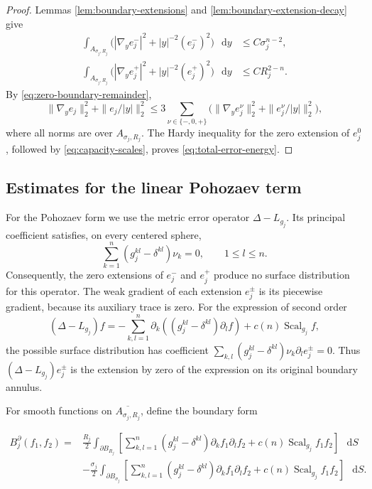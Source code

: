 \documentclass[11pt]{article}
\numberwithin{equation}{section}
\theoremstyle{remark}
\newcommand{\dd}{\mathop{}\!\mathrm{d}}
\begin{document}
\begin{proof}
Lemmas  \ref{lem:boundary-extensions} and
\ref{lem:boundary-extension-decay} give
\[
 \begin{aligned}
 \int_{A_{\sigma_j,R_j}}\bigl(|\nabla_ye_j^-|^2+|y|^{-2}(e_j^-)^2\bigr)\,\dd y
 &\le C\sigma_j^{n-2},\\
 \int_{A_{\sigma_j,R_j}}\bigl(|\nabla_ye_j^+|^2+|y|^{-2}(e_j^+)^2\bigr)\,\dd y
 &\le CR_j^{2-n}.
 \end{aligned}
\]
By \eqref{eq:zero-boundary-remainder},
\[
 \|\nabla_ye_j\|_2^2+\|e_j/|y|\|_2^2
 \le3\sum_{\nu\in\{-,0,+\}}
 \bigl(\|\nabla_ye_j^\nu\|_2^2+\|e_j^\nu/|y|\|_2^2\bigr),
\]
where all norms are over \(A_{\sigma_j,R_j}\). The Hardy inequality
for the zero extension of \(e_j^0\), followed by
\eqref{eq:capacity-scales}, proves \eqref{eq:total-error-energy}.
\end{proof}

\subsection{Estimates for the linear Pohozaev term}

For the Pohozaev form we use the metric error operator
\(\Delta-L_{g_j}\). Its principal coefficient satisfies, on every
centered sphere,
\begin{equation}\label{eq:metric-error-radial-conormal}
 \sum_{k=1}^n(g_j^{kl}-\delta^{kl})\nu_k=0,
 \qquad 1\le l\le n.
\end{equation}
Consequently, the zero extensions of \(e_j^-\) and \(e_j^+\) produce no
surface distribution for this operator.
The weak gradient of each extension \(e_j^\pm\) is its piecewise gradient,
because its auxiliary trace is zero. For the expression of second order
\[
 (\Delta-L_{g_j})f
 =-\sum_{k,l=1}^n\partial_k
 ((g_j^{kl}-\delta^{kl})\partial_lf)+c(n)\operatorname{Scal}_{g_j}f,
\]
the possible surface distribution has coefficient
\(\sum_{k,l}(g_j^{kl}-\delta^{kl})\nu_k\partial_le_j^\pm=0\).
Thus \((\Delta-L_{g_j})e_j^\pm\) is the extension by zero of the
expression on its original boundary annulus.

For smooth functions on \(\overline{A_{\sigma_j,R_j}}\), define the boundary form
 
\begin{equation}\label{eq:dilation-boundary-form}
 \begin{aligned}
  B_j^\partial(f_1,f_2)
 ={}&\frac{R_j}{2}\int_{\partial B_{R_j}}
 \left[
 \sum_{k,l=1}^n(g_j^{kl}-\delta^{kl})\partial_kf_1\partial_lf_2
 +c(n)\operatorname{Scal}_{g_j}f_1f_2\right]\,\dd S\\
 &-\frac{\sigma_j}{2}\int_{\partial B_{\sigma_j}}
 \left[
 \sum_{k,l=1}^n(g_j^{kl}-\delta^{kl})\partial_kf_1\partial_lf_2
 +c(n)\operatorname{Scal}_{g_j}f_1f_2\right]\,\dd S.
 \end{aligned}
\end{equation}
\end{document}
